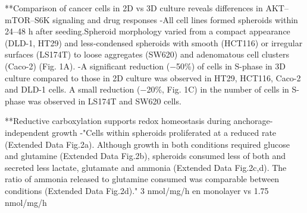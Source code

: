 \documentclass[11pt,a4paper]{article}
\begin{document}
**Comparison of cancer cells in 2D vs 3D culture reveals differences in AKT–mTOR–S6K signaling and drug responses
-All cell lines formed spheroids within 24–48 h after seeding.Spheroid morphology varied from a compact appearance (DLD-1, HT29) and less-condensed spheroids with smooth (HCT116) or irregular surfaces (LS174T) to loose aggregates (SW620) and adenomatous cell clusters (Caco-2) (Fig. 1A). 
-A significant reduction (−50\%) of cells in S-phase in 3D culture compared to those in 2D culture was observed in HT29, HCT116, Caco-2 and DLD-1 cells.
A small reduction (−20\%, Fig. 1C) in the number of cells in S-phase was observed in LS174T and SW620 cells.

**Reductive carboxylation supports redox homeostasis during anchorage-independent growth
-"Cells within spheroids proliferated at a reduced rate (Extended Data Fig.2a). Although growth in both conditions required glucose and glutamine (Extended Data Fig.2b), spheroids consumed less of both and secreted less lactate, glutamate and ammonia (Extended Data Fig.2c,d). The ratio of ammonia released to glutamine consumed was comparable between conditions (Extended Data Fig.2d)."
3 nmol/mg/h en monolayer vs 1.75 nmol/mg/h
\end{document}
